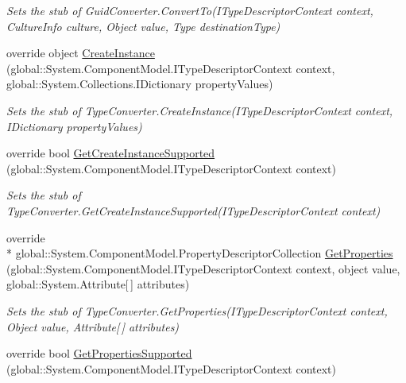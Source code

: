 \begin{DoxyCompactItemize}
\begin{DoxyCompactList}\small\item\em Sets the stub of Guid\-Converter.\-Convert\-To(\-I\-Type\-Descriptor\-Context context, Culture\-Info culture, Object value, Type destination\-Type)\end{DoxyCompactList}\item 
override object \hyperlink{class_system_1_1_component_model_1_1_fakes_1_1_stub_guid_converter_a2eed845edf4bf218e7f7f86a453dc71b}{Create\-Instance} (global\-::\-System.\-Component\-Model.\-I\-Type\-Descriptor\-Context context, global\-::\-System.\-Collections.\-I\-Dictionary property\-Values)
\begin{DoxyCompactList}\small\item\em Sets the stub of Type\-Converter.\-Create\-Instance(\-I\-Type\-Descriptor\-Context context, I\-Dictionary property\-Values)\end{DoxyCompactList}\item 
override bool \hyperlink{class_system_1_1_component_model_1_1_fakes_1_1_stub_guid_converter_a1153251140c050dba74488692d276829}{Get\-Create\-Instance\-Supported} (global\-::\-System.\-Component\-Model.\-I\-Type\-Descriptor\-Context context)
\begin{DoxyCompactList}\small\item\em Sets the stub of Type\-Converter.\-Get\-Create\-Instance\-Supported(\-I\-Type\-Descriptor\-Context context)\end{DoxyCompactList}\item 
override \\*
global\-::\-System.\-Component\-Model.\-Property\-Descriptor\-Collection \hyperlink{class_system_1_1_component_model_1_1_fakes_1_1_stub_guid_converter_a7d7600e731cd0a980b320e4059ba02eb}{Get\-Properties} (global\-::\-System.\-Component\-Model.\-I\-Type\-Descriptor\-Context context, object value, global\-::\-System.\-Attribute\mbox{[}$\,$\mbox{]} attributes)
\begin{DoxyCompactList}\small\item\em Sets the stub of Type\-Converter.\-Get\-Properties(\-I\-Type\-Descriptor\-Context context, Object value, Attribute\mbox{[}$\,$\mbox{]} attributes)\end{DoxyCompactList}\item 
override bool \hyperlink{class_system_1_1_component_model_1_1_fakes_1_1_stub_guid_converter_a8c3d469365560119942cb5b1e321af6f}{Get\-Properties\-Supported} (global\-::\-System.\-Component\-Model.\-I\-Type\-Descriptor\-Context context)

\end{DoxyCompactItemize}
